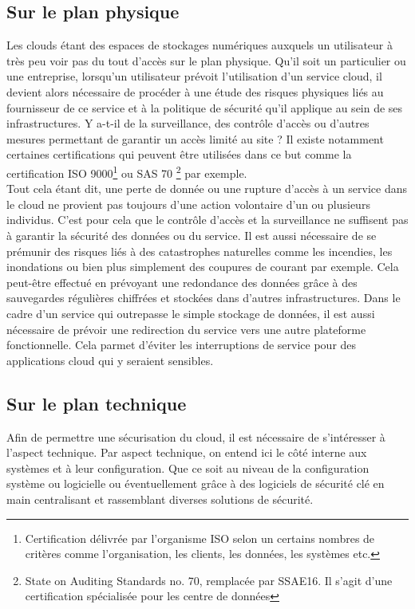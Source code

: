 \documentclass[a4paper, 12pt]{article}
\begin{document}
    \subsection{Sur le plan physique}
      Les clouds étant des espaces de stockages numériques auxquels un
      utilisateur à très peu voir pas du tout d'accès sur le plan physique.
      Qu'il soit un particulier ou une entreprise, lorsqu'un utilisateur
      prévoit l'utilisation d'un service cloud, il devient alors nécessaire de
      procéder à une étude des risques physiques liés au fournisseur de
      ce service et à la politique de sécurité qu'il applique au sein de ses
      infrastructures. Y a-t-il de la surveillance, des contrôle d'accès ou
      d'autres mesures permettant de garantir un accès limité au site ? Il
      existe notamment certaines certifications qui peuvent être utilisées dans
      ce but comme la certification ISO 9000\footnote{Certification délivrée
      par l'organisme ISO selon un certains nombres de critères comme
      l'organisation, les clients, les données, les systèmes etc.} ou SAS 70
      \footnote{State on Auditing Standards no. 70, remplacée par SSAE16. Il
      s'agit d'une certification spécialisée pour les centre de données} par
      exemple. \\

      Tout cela étant dit, une perte de donnée ou une rupture d'accès à un
      service dans le cloud ne provient pas toujours d'une action volontaire
      d'un ou plusieurs individus. C'est pour cela que le contrôle d'accès et
      la surveillance ne suffisent pas à garantir la sécurité des données ou
      du service. Il est aussi nécessaire de se prémunir des risques liés à des
      catastrophes naturelles comme les incendies, les inondations ou bien
      plus simplement des coupures de courant par exemple. Cela peut-être
      effectué en prévoyant une redondance des données grâce à des sauvegardes
      régulières chiffrées et stockées dans d'autres infrastructures. Dans le
      cadre d'un service qui outrepasse le simple stockage de données, il est
      aussi nécessaire de prévoir une redirection du service vers une autre
      plateforme fonctionnelle. Cela parmet d'éviter les interruptions de
      service pour des applications cloud qui y seraient sensibles.

    \subsection{Sur le plan technique}
      Afin de permettre une sécurisation du cloud, il est nécessaire de
      s'intéresser à l'aspect technique. Par aspect technique, on entend ici
      le côté interne aux systèmes et à leur configuration. Que ce soit au
      niveau de la configuration système ou logicielle ou éventuellement grâce
      à des logiciels de sécurité clé en main centralisant et rassemblant
      diverses solutions de sécurité. \\
\end{document}

